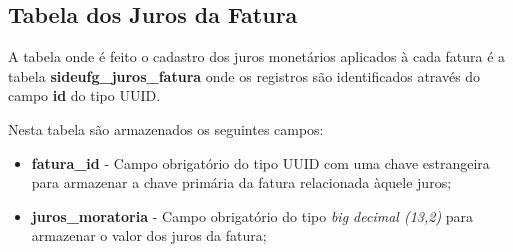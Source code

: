 \subsection{Tabela dos Juros da Fatura}
\label{sub:tabela-juros-fatura}

A tabela onde é feito o cadastro dos juros monetários aplicados à cada fatura é a tabela \textbf{sideufg\_juros\_fatura} onde os registros são identificados através do campo \textbf{id} do tipo UUID.

Nesta tabela são armazenados os seguintes campos:

\begin{itemize}
    \item \textbf{fatura\_id} - Campo obrigatório do tipo UUID com uma chave estrangeira para armazenar a chave primária da fatura relacionada àquele juros;
    \item \textbf{juros\_moratoria} - Campo obrigatório do tipo \textit{big decimal (13,2)} para armazenar o valor dos juros da fatura;
\end{itemize}